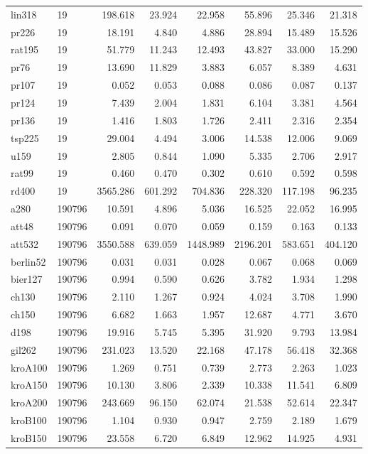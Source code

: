 \begin{center}
\begin{longtable}{llrrrrrr}
lin318  & 19 & 198.618 & 23.924 & 22.958 & 55.896 & 25.346 & 21.318\\
pr226  & 19 & 18.191 & 4.840 & 4.886 & 28.894 & 15.489 & 15.526\\
rat195  & 19 & 51.779 & 11.243 & 12.493 & 43.827 & 33.000 & 15.290\\
pr76  & 19 & 13.690 & 11.829 & 3.883 & 6.057 & 8.389 & 4.631\\
pr107  & 19 & 0.052 & 0.053 & 0.088 & 0.086 & 0.087 & 0.137\\
pr124  & 19 & 7.439 & 2.004 & 1.831 & 6.104 & 3.381 & 4.564\\
pr136  & 19 & 1.416 & 1.803 & 1.726 & 2.411 & 2.316 & 2.354\\
tsp225  & 19 & 29.004 & 4.494 & 3.006 & 14.538 & 12.006 & 9.069\\
u159  & 19 & 2.805 & 0.844 & 1.090 & 5.335 & 2.706 & 2.917\\
rat99  & 19 & 0.460 & 0.470 & 0.302 & 0.610 & 0.592 & 0.598\\
rd400  & 19 & 3565.286 & 601.292 & 704.836 & 228.320 & 117.198 & 96.235\\
a280 & 190796 & 10.591 & 4.896 & 5.036 & 16.525 & 22.052 & 16.995\\
att48  & 190796 & 0.091 & 0.070 & 0.059 & 0.159 & 0.163 & 0.133\\
att532  & 190796 & 3550.588 & 639.059 & 1448.989 & 2196.201 & 583.651 & 404.120\\
berlin52  & 190796 & 0.031 & 0.031 & 0.028 & 0.067 & 0.068 & 0.069\\
bier127  & 190796 & 0.994 & 0.590 & 0.626 & 3.782 & 1.934 & 1.298\\
ch130  & 190796 & 2.110 & 1.267 & 0.924 & 4.024 & 3.708 & 1.990\\
ch150  & 190796 & 6.682 & 1.663 & 1.957 & 12.687 & 4.771 & 3.670\\
d198  & 190796 & 19.916 & 5.745 & 5.395 & 31.920 & 9.793 & 13.984\\
gil262  & 190796 & 231.023 & 13.520 & 22.168 & 47.178 & 56.418 & 32.368\\
kroA100  & 190796 & 1.269 & 0.751 & 0.739 & 2.773 & 2.263 & 1.023\\
kroA150  & 190796 & 10.130 & 3.806 & 2.339 & 10.338 & 11.541 & 6.809\\
kroA200  & 190796 & 243.669 & 96.150 & 62.074 & 21.538 & 52.614 & 22.347\\
kroB100  & 190796 & 1.104 & 0.930 & 0.947 & 2.759 & 2.189 & 1.679\\
kroB150  & 190796 & 23.558 & 6.720 & 6.849 & 12.962 & 14.925 & 4.931\\

\end{longtable}
\end{center}

